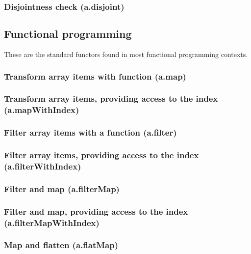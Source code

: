 \documentclass{article}
\theoremstyle{definition}
\begin{document}
\subsubsection{Disjointness check (a.disjoint)}

\subsection{Functional programming}

These are the standard functors found in most functional programming contexts.

\subsubsection{Transform array items with function (a.map)}

\subsubsection{Transform array items, providing access to the index (a.mapWithIndex)}

\subsubsection{Filter array items with a function (a.filter)}

\subsubsection{Filter array items, providing access to the index (a.filterWithIndex)}

\subsubsection{Filter and map (a.filterMap)}

\subsubsection{Filter and map, providing access to the index (a.filterMapWithIndex)}

\subsubsection{Map and flatten (a.flatMap)}
\end{document}
